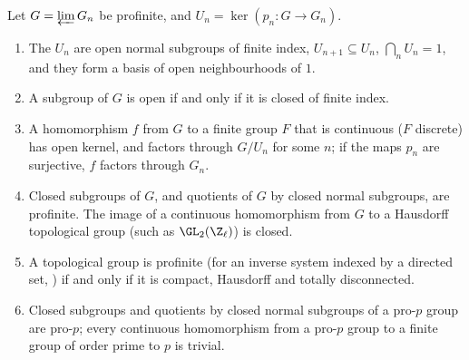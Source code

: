 \begin{proposition}\label{prop:groups:profinite}
Let $G=\varprojlim G_n$ be profinite, and $U_n=\ker(p_n\colon G\to G_n)$.
\begin{enumerate}[label=(\roman*)]
\item The $U_n$ are open normal subgroups of finite index, $U_{n+1}\subseteq U_n$, $\bigcap_nU_n=1$, and they form a basis of open neighbourhoods of $1$.
\item A subgroup of $G$ is open if and only if it is closed of finite index.
\item A homomorphism $f$ from $G$ to a finite group $F$ that is continuous ($F$ discrete) has open kernel, and factors through $G/U_n$ for some $n$; if the maps $p_n$ are
surjective, $f$ factors through $G_n$.
\item Closed subgroups of $G$, and quotients of $G$ by closed normal subgroups, are profinite. The image of a continuous homomorphism from $G$ to a Hausdorff
topological group (such as $\GL_2(\Z_\ell)$) is closed.
\item A topological group is profinite (for an inverse system indexed by a directed set, ) if and only if it is compact, Hausdorff and totally
disconnected.
\item Closed subgroups and quotients by closed normal subgroups of a pro-$p$ group are pro-$p$; every continuous homomorphism from a pro-$p$ group to a finite group of
order prime to $p$ is trivial.
\end{enumerate}
\end{proposition}

